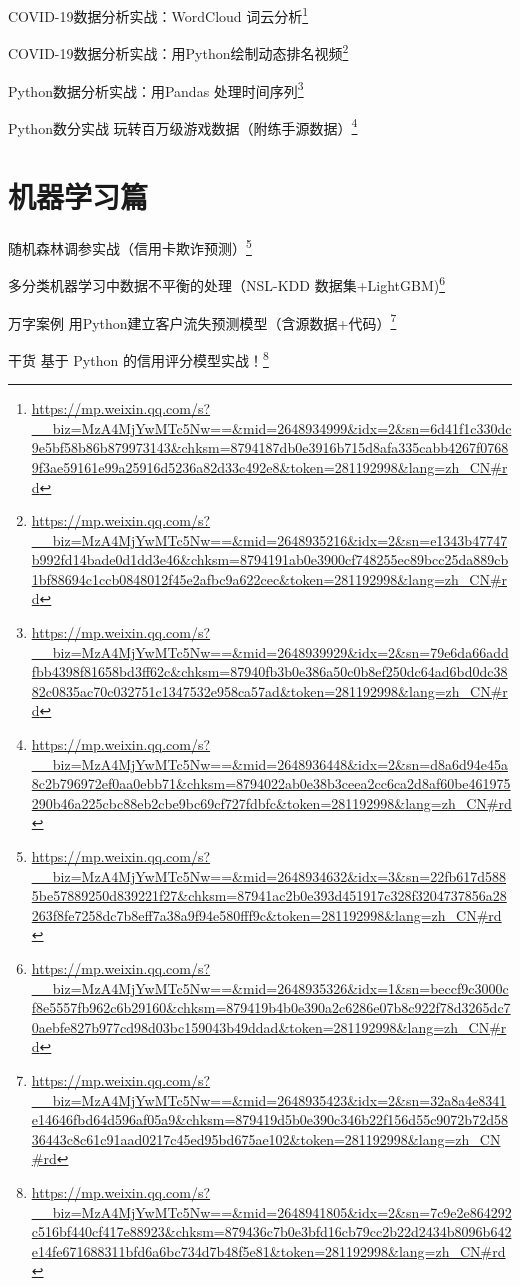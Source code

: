 \documentclass[]{ctexbook}
\renewcommand{\href}[2]{#2\footnote{\url{#1}}}
\begin{document}
\href{https://mp.weixin.qq.com/s?__biz=MzA4MjYwMTc5Nw==\&mid=2648934999\&idx=2\&sn=6d41f1c330dc9e5bf58b86b879973143\&chksm=8794187db0e3916b715d8afa335cabb4267f07689f3ae59161e99a25916d5236a82d33c492e8\&token=281192998\&lang=zh_CN\#rd}{COVID-19数据分析实战：WordCloud 词云分析}

\href{https://mp.weixin.qq.com/s?__biz=MzA4MjYwMTc5Nw==\&mid=2648935216\&idx=2\&sn=e1343b47747b992fd14bade0d1dd3e46\&chksm=8794191ab0e3900cf748255ec89bcc25da889cb1bf88694c1ccb0848012f45e2afbc9a622cec\&token=281192998\&lang=zh_CN\#rd}{COVID-19数据分析实战：用Python绘制动态排名视频}

\href{https://mp.weixin.qq.com/s?__biz=MzA4MjYwMTc5Nw==\&mid=2648939929\&idx=2\&sn=79e6da66addfbb4398f81658bd3ff62c\&chksm=87940fb3b0e386a50c0b8ef250dc64ad6bd0dc3882c0835ac70c032751c1347532e958ca57ad\&token=281192998\&lang=zh_CN\#rd}{Python数据分析实战：用Pandas 处理时间序列}

\href{https://mp.weixin.qq.com/s?__biz=MzA4MjYwMTc5Nw==\&mid=2648936448\&idx=2\&sn=d8a6d94e45a8c2b796972ef0aa0ebb71\&chksm=8794022ab0e38b3ceea2cc6ca2d8af60be461975290b46a225cbc88eb2cbe9bc69cf727fdbfc\&token=281192998\&lang=zh_CN\#rd}{Python数分实战 \textbar{} 玩转百万级游戏数据（附练手源数据）}

\hypertarget{ux673aux5668ux5b66ux4e60ux7bc7}{%
\section{机器学习篇}\label{ux673aux5668ux5b66ux4e60ux7bc7}}

\href{https://mp.weixin.qq.com/s?__biz=MzA4MjYwMTc5Nw==\&mid=2648934632\&idx=3\&sn=22fb617d5885be57889250d839221f27\&chksm=87941ac2b0e393d451917c328f3204737856a28263f8fe7258dc7b8eff7a38a9f94e580fff9c\&token=281192998\&lang=zh_CN\#rd}{随机森林调参实战（信用卡欺诈预测）}

\href{https://mp.weixin.qq.com/s?__biz=MzA4MjYwMTc5Nw==\&mid=2648935326\&idx=1\&sn=beccf9c3000cf8e5557fb962c6b29160\&chksm=879419b4b0e390a2c6286e07b8c922f78d3265dc70aebfe827b977cd98d03bc159043b49ddad\&token=281192998\&lang=zh_CN\#rd}{多分类机器学习中数据不平衡的处理（NSL-KDD 数据集+LightGBM)}

\href{https://mp.weixin.qq.com/s?__biz=MzA4MjYwMTc5Nw==\&mid=2648935423\&idx=2\&sn=32a8a4e8341e14646fbd64d596af05a9\&chksm=879419d5b0e390c346b22f156d55c9072b72d5836443c8c61c91aad0217c45ed95bd675ae102\&token=281192998\&lang=zh_CN\#rd}{万字案例 \textbar{} 用Python建立客户流失预测模型（含源数据+代码）}

\href{https://mp.weixin.qq.com/s?__biz=MzA4MjYwMTc5Nw==\&mid=2648941805\&idx=2\&sn=7c9e2e864292c516bf440cf417e88923\&chksm=879436c7b0e3bfd16cb79cc2b22d2434b8096b642e14fe671688311bfd6a6bc734d7b48f5e81\&token=281192998\&lang=zh_CN\#rd}{干货 \textbar{} 基于 Python 的信用评分模型实战！}
\end{document}
